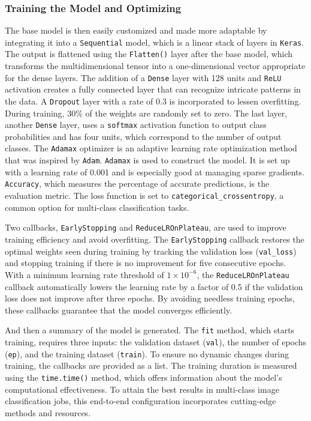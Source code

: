 \documentclass[12pt,onecolumn]{report}
\begin{document}
\subsubsection{Training the Model and Optimizing}
The base model is then easily customized and made more adaptable by integrating it into a \texttt{Sequential} model, which is a linear stack of layers in \texttt{Keras}. The output is flattened using the \texttt{Flatten()} layer after the base model, which transforms the multidimensional tensor into a one-dimensional vector appropriate for the dense layers. The addition of a \texttt{Dense} layer with 128 units and \texttt{ReLU} activation creates a fully connected layer that can recognize intricate patterns in the data. A \texttt{Dropout} layer with a rate of 0.3 is incorporated to lessen overfitting. During training, 30\% of the weights are randomly set to zero. The last layer, another \texttt{Dense} layer, uses a \texttt{softmax} activation function to output class probabilities and has four units, which correspond to the number of output classes.
The \texttt{Adamax} optimizer is an adaptive learning rate optimization method that was inspired by \texttt{Adam}. \texttt{Adamax} is used to construct the model. It is set up with a learning rate of 0.001 and is especially good at managing sparse gradients. \texttt{Accuracy}, which measures the percentage of accurate predictions, is the evaluation metric. The loss function is set to \texttt{categorical\_crossentropy}, a common option for multi-class classification tasks.

Two callbacks, \texttt{EarlyStopping} and \texttt{ReduceLROnPlateau}, are used to improve training efficiency and avoid overfitting. The \texttt{EarlyStopping} callback restores the optimal weights seen during training by tracking the validation loss (\texttt{val\_loss}) and stopping training if there is no improvement for five consecutive epochs. With a minimum learning rate threshold of \(1 \times 10^{-6}\), the \texttt{ReduceLROnPlateau} callback automatically lowers the learning rate by a factor of 0.5 if the validation loss does not improve after three epochs. By avoiding needless training epochs, these callbacks guarantee that the model converges efficiently.

And then a summary of the model is generated. The \texttt{fit} method, which starts training, requires three inputs: the validation dataset (\texttt{val}), the number of epochs (\texttt{ep}), and the training dataset (\texttt{train}). To ensure no dynamic changes during training, the callbacks are provided as a list. The training duration is measured using the \texttt{time.time()} method, which offers information about the model's computational effectiveness. To attain the best results in multi-class image classification jobs, this end-to-end configuration incorporates cutting-edge methods and resources.
\end{document}
